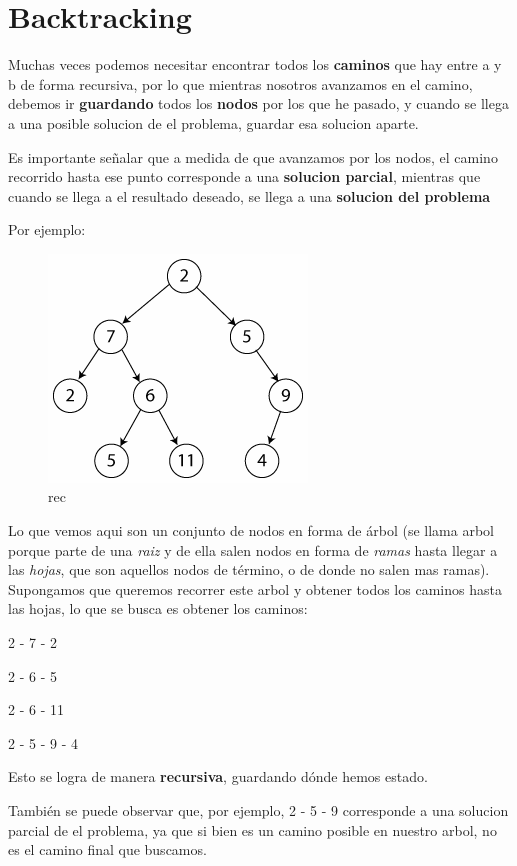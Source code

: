 \documentclass[11pt]{article}
\makeatletter
\def\maxwidth{\ifdim\Gin@nat@width>\linewidth\linewidth
    \else\Gin@nat@width\fi}
\let\Oldincludegraphics\includegraphics
\renewcommand{\includegraphics}[1]{\Oldincludegraphics[width=.8\maxwidth]{#1}}
\makeatother
\begin{document}
\hypertarget{backtracking}{%
\section{Backtracking}\label{backtracking}}

Muchas veces podemos necesitar encontrar todos los \textbf{caminos} que
hay entre a y b de forma recursiva, por lo que mientras nosotros
avanzamos en el camino, debemos ir \textbf{guardando} todos los
\textbf{nodos} por los que he pasado, y cuando se llega a una posible
solucion de el problema, guardar esa solucion aparte.

Es importante señalar que a medida de que avanzamos por los nodos, el
camino recorrido hasta ese punto corresponde a una \textbf{solucion
parcial}, mientras que cuando se llega a el resultado deseado, se llega
a una \textbf{solucion del problema}

Por ejemplo:

\begin{figure}
\centering
\includegraphics{imgs/arbol.gif}
\caption{rec}
\end{figure}

    Lo que vemos aqui son un conjunto de nodos en forma de árbol (se llama
arbol porque parte de una \emph{raiz} y de ella salen nodos en forma de
\emph{ramas} hasta llegar a las \emph{hojas}, que son aquellos nodos de
término, o de donde no salen mas ramas). Supongamos que queremos
recorrer este arbol y obtener todos los caminos hasta las hojas, lo que
se busca es obtener los caminos:

2 - 7 - 2

2 - 6 - 5

2 - 6 - 11

2 - 5 - 9 - 4

Esto se logra de manera \textbf{recursiva}, guardando dónde hemos
estado.

También se puede observar que, por ejemplo, 2 - 5 - 9 corresponde a una
solucion parcial de el problema, ya que si bien es un camino posible en
nuestro arbol, no es el camino final que buscamos.
\end{document}
